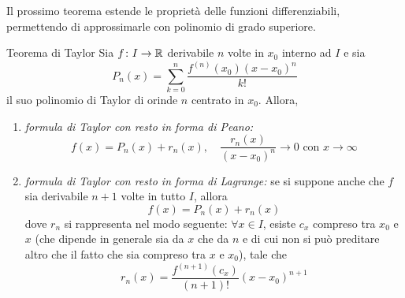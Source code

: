 \documentclass[a4paper]{article}
\begin{document}
\begin{radioactive}
Il prossimo teorema estende le proprietà delle funzioni differenziabili,
permettendo di approssimarle con polinomio di grado superiore.

\begin{snippettheorem}{Teorema di Taylor}
    Sia \(f\colon I \to \mathbb{R}\) derivabile
    \(n\) volte in \(x_0\) interno ad \(I\) e sia
    \[
        P_n(x) = \sum_{k=0}^n \frac{f^{(n)}(x_0){(x-x_0)}^n}{k!}
    \]
    il suo polinomio di Taylor di orinde \(n\)
    centrato in \(x_0\).
    Allora,
    \begin{enumerate}
        \item \emph{formula di Taylor con resto in forma di Peano:} \[
            f(x) = P_n(x) + r_n(x), \quad \frac{r_n(x)}{{(x-x_0)}^n} \to 0 \text{ con } x\to \infty
        \]
        \item \emph{formula di Taylor con resto in forma di Lagrange:} se si suppone anche che \(f\) sia derivabile \(n+1\) volte
        in tutto \(I\), allora
        \[
            f(x) = P_n(x) + r_n(x)
        \]
        dove \(r_n\) si rappresenta nel modo seguente:
        \(\forall x\in I\), esiste \(c_x\) compreso tra \(x_0\) e \(x\)
        (che dipende in generale sia da \(x\) che da \(n\) e di cui non si può preditare altro che il fatto che sia
        compreso tra \(x\) e \(x_0\)), tale che
        \[
            r_n(x) = \frac{f^{(n+1)}(c_x)}{(n+1)!} (x-x_0)^{n+1}
        \]
    \end{enumerate}
\end{snippettheorem}


\end{radioactive}
\end{document}
